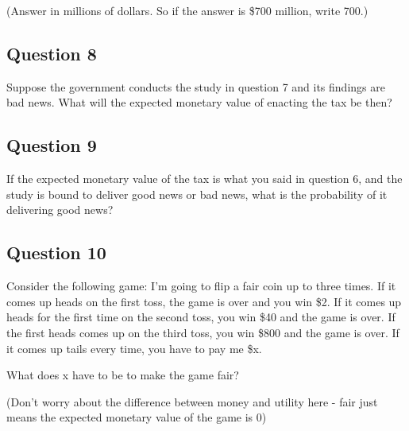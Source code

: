 \documentclass[
  11pt,
]{article}
\begin{document}
(Answer in millions of dollars. So if the answer is \$700 million, write
700.)

\hypertarget{question-8}{%
\subsection{Question 8}\label{question-8}}

Suppose the government conducts the study in question 7 and its findings
are bad news. What will the expected monetary value of enacting the tax
be then?

\hypertarget{question-9}{%
\subsection{Question 9}\label{question-9}}

If the expected monetary value of the tax is what you said in question
6, and the study is bound to deliver good news or bad news, what is the
probability of it delivering good news?

\hypertarget{question-10}{%
\subsection{Question 10}\label{question-10}}

Consider the following game: I'm going to flip a fair coin up to three
times. If it comes up heads on the first toss, the game is over and you
win \$2. If it comes up heads for the first time on the second toss, you
win \$40 and the game is over. If the first heads comes up on the third
toss, you win \$800 and the game is over. If it comes up tails every
time, you have to pay me \$x.

What does x have to be to make the game fair?

(Don't worry about the difference between money and utility here - fair
just means the expected monetary value of the game is 0)
\end{document}
